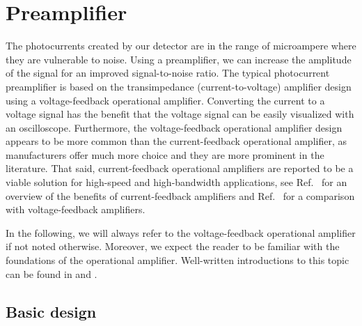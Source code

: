\section{Preamplifier}

The photocurrents created by our detector are in the range of microampere where they are vulnerable to noise.
Using a preamplifier, we can increase the amplitude of the signal for an improved signal-to-noise ratio.
The typical photocurrent preamplifier is based on the transimpedance (current-to-voltage) amplifier design using a voltage-feedback operational amplifier.
Converting the current to a voltage signal has the benefit that the voltage signal can be easily visualized with an oscilloscope.
Furthermore, the voltage-feedback operational amplifier design appears to be more common than the current-feedback operational amplifier, as manufacturers offer much more choice and they are more prominent in the literature.
That said, current-feedback operational amplifiers are reported to be a viable solution for high-speed and high-bandwidth applications, see Ref.~\cite[p.~110]{Jung05} for an overview of the benefits of current-feedback amplifiers and Ref.~\cite[Ch.~9]{Carter17} for a comparison with voltage-feedback amplifiers.

In the following, we will always refer to the voltage-feedback operational amplifier if not noted otherwise.
Moreover, we expect the reader to be familiar with the foundations of the operational amplifier.
Well-written introductions to this topic can be found in \cite[Ch.~1]{Jung05} and \cite[Ch.~3]{Carter17}.

\subsection{Basic design}

